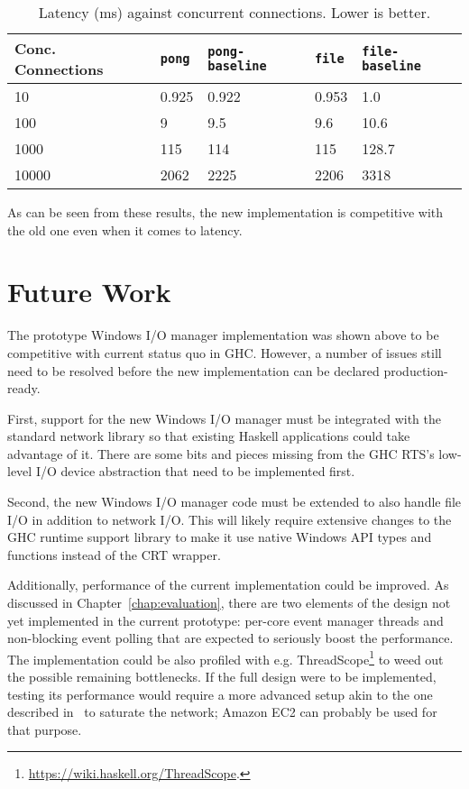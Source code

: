 \documentclass[a4paper,11pt,oneside]{report}
\begin{document}
\begin{table}[h!]
\centering
\begin{tabular}{ | l | l | l | l | l | }
\hline
Conc. Connections &  \texttt{pong}  & \texttt{pong-baseline} & \texttt{file} &
\texttt{file-baseline} \\
\hline
10 &     0.925 &   0.922 &         0.953 & 1.0\\
\hline
100 &     9 &      9.5 &           9.6 &   10.6\\
\hline
1000 &    115 &    114 &          115  & 128.7\\
\hline
10000 &  2062 &   2225 &         2206  & 3318\\
\hline
\end{tabular}
\caption{Latency (ms) against concurrent connections. Lower is better. }
\label{tbl:latency}
\end{table}

As can be seen from these results, the new implementation is competitive with
the old one even when it comes to latency.

\chapter{Future Work}
\label{chap:future-work}

The prototype Windows I/O manager implementation was shown above to be
competitive with current status quo in GHC. However, a number of issues still
need to be resolved before the new implementation can be declared
production-ready.

First, support for the new Windows I/O manager must be integrated with the
standard network library so that existing Haskell applications could take
advantage of it. There are some bits and pieces missing from the GHC RTS's
low-level I/O device abstraction that need to be implemented first.

Second, the new Windows I/O manager code must be extended to also handle file
I/O in addition to network I/O. This will likely require extensive changes to
the GHC runtime support library to make it use native Windows API types and
functions instead of the CRT wrapper.

Additionally, performance of the current implementation could be improved. As
discussed in Chapter~\ref{chap:evaluation}, there are two elements of the design
not yet implemented in the current prototype: per-core event manager threads and
non-blocking event polling that are expected to seriously boost the
performance. The implementation could be also profiled with
e.g. ThreadScope\footnote{\url{https://wiki.haskell.org/ThreadScope}.} to weed
out the possible remaining bottlenecks. If the full design were to be
implemented, testing its performance would require a more advanced setup akin to
the one described in~\cite{bib:voellmy} to saturate the network; Amazon EC2 can
probably be used for that purpose.
\end{document}
